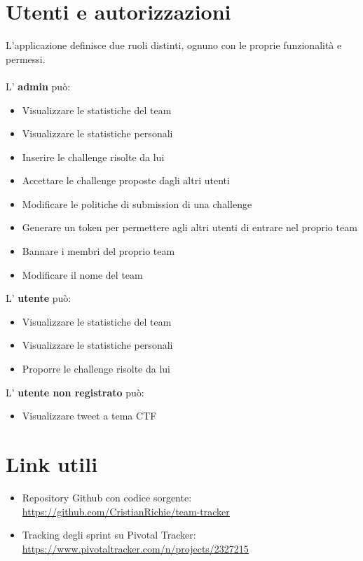 \documentclass[a4paper,12pt]{extarticle}
\begin{document}




\section{Utenti e autorizzazioni}
L'applicazione definisce due ruoli distinti, ognuno con le proprie funzionalità e permessi.\\ \\
L' \textbf{admin} può:
\begin{itemize}
    \item Visualizzare le statistiche del team
    \item Visualizzare le statistiche personali
    \item Inserire le challenge risolte da lui
    \item Accettare le challenge proposte dagli altri utenti
    \item Modificare le politiche di submission di una challenge
    \item Generare un token per permettere agli altri utenti di entrare nel proprio team
    \item Bannare i membri del proprio team
    \item Modificare il nome del team
\end{itemize}
L' \textbf{utente} può:
\begin{itemize}
    \item Visualizzare le statistiche del team
    \item Visualizzare le statistiche personali
    \item Proporre le challenge risolte da lui
\end{itemize}
L' \textbf{utente non registrato} può:
\begin{itemize}
    \item Visualizzare tweet a tema CTF
\end{itemize}
\section{Link utili}
\begin{itemize}
    \item Repository Github con codice sorgente: \\ \href{https://github.com/CristianRichie/team-tracker}{https://github.com/CristianRichie/team-tracker}
    \item Tracking degli sprint su Pivotal Tracker: \\ \href{https://www.pivotaltracker.com/n/projects/2327215}{https://www.pivotaltracker.com/n/projects/2327215}
\end{itemize}
\end{document}
